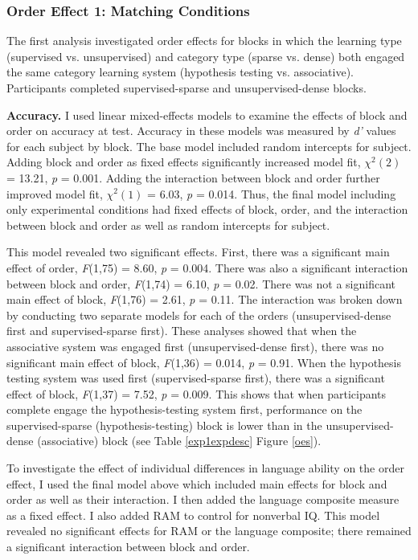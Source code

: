 \documentclass[../dissertation.tex]{subfiles}
\begin{document}
		
\subsubsection{Order Effect 1: Matching Conditions}
	The first analysis investigated order effects for blocks in which the learning type (supervised vs. unsupervised) and category type (sparse vs. dense) both engaged the same category learning system (hypothesis testing vs. associative). Participants completed supervised-sparse and unsupervised-dense blocks.  \par
	\textbf{Accuracy.} I used linear mixed-effects models to examine the effects of block and order on accuracy at test. Accuracy in these models was measured by \textit{d'} values for each subject by block. The base model included random intercepts for subject. Adding block and order as fixed effects significantly increased model fit, $\chi^{2}(2)$ = 13.21,  \textit{p} = 0.001. Adding the interaction between block and order further improved model fit, $\chi^{2}(1)$ = 6.03,  \textit{p} = 0.014. Thus, the final model including only experimental conditions had fixed effects of block, order, and the interaction between block and order as well as random intercepts for subject. \par
	This model revealed two significant effects. First, there was a significant main effect of order, \textit{F}(1,75) = 8.60, \textit{p} = 0.004. There was also a significant interaction between block and order, \textit{F}(1,74) = 6.10, \textit{p} = 0.02. There was not a significant main effect of block, \textit{F}(1,76) = 2.61, \textit{p} = 0.11. The interaction was broken down by conducting two separate models for each of the orders (unsupervised-dense first and supervised-sparse first). These analyses showed that when the associative system was engaged first (unsupervised-dense first), there was no significant main effect of block, \textit{F}(1,36) = 0.014, \textit{p} = 0.91. When the hypothesis testing system was used first (supervised-sparse first), there was a significant effect of block, \textit{F}(1,37) = 7.52, \textit{p} = 0.009. This shows that when participants complete engage the hypothesis-testing system first, performance on the supervised-sparse (hypothesis-testing) block is lower than in the unsupervised-dense (associative) block (see Table \ref {exp1expdesc} Figure \ref{oes}). \par
	To investigate the effect of individual differences in language ability on the order effect, I used the final model above which included main effects for block and order as well as their interaction. I then added  the language composite measure as a fixed effect. I also added RAM to control for nonverbal IQ. This model revealed no significant effects for RAM or the language composite; there remained a significant interaction between block and order. \par
\end{document}
